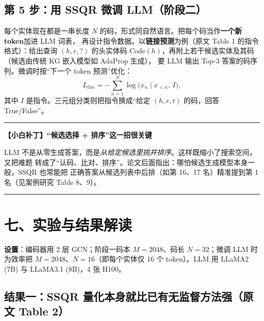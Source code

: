 \documentclass[11pt,UTF8,fontset=fandol]{ctexart}
\newenvironment{tip}[1]{%
  \par\smallskip\noindent\rule{\linewidth}{0.4pt}\par\nobreak
  \noindent\textbf{【小白补丁】#1}\par\nobreak\noindent\ignorespaces
}{%
  \par\noindent\rule{\linewidth}{0.4pt}\par\smallskip
}
\begin{document}
\subsection{第 5 步：用 SSQR 微调 LLM（阶段二）}
每个实体现在都是一串长度 $N$ 的码，形式同自然语言。把每个码当作\textbf{一个新 token}加进 LLM 词表，
再设计指令数据。以\textbf{链接预测}为例（原文 Table 1 的指令格式）：给出查询 $(h,r,?)$ 的头实体码
$\mathrm{Code}(h)$，再附上若干候选实体及其码（候选由传统 KG 嵌入模型如 AdaProp 生成），
要 LLM 输出 Top-3 答案的码序列。微调时按“下一个 token 预测”优化：
\begin{equation*}
  L_{llm}=-\sum_{n=1}^{N}\log\big(x_n\mid x_{<n},\,I\big),\tag{10}
\end{equation*}
其中 $I$ 是指令。三元组分类则把指令换成“给定 $(h,r,t)$ 的码，回答 True/False”。

\begin{tip}{“候选选择 + 排序”这一招很关键}
LLM 不是从零生成答案，而是\emph{从给定候选里挑并排序}。这样既缩小了搜索空间，又把难题
转成了“认码、比对、排序”。论文后面指出：哪怕候选生成模型本身一般，SSQR 也常能把
正确答案从候选列表中后排（如第 16、17 名）精准提到第 1 名（见案例研究 Table 8、9）。
\end{tip}

\section{七、实验与结果解读}

\textbf{设置}：编码器用 2 层 GCN；阶段一码本 $M{=}2048$、码长 $N{=}32$；微调 LLM 时为效率把
$M{=}2048$、$N{=}16$（即每个实体仅 16 个 token）。LLM 用 LLaMA2 (7B) 与 LLaMA3.1 (8B)，4 张 H100。

\subsection{结果一：SSQR 量化本身就比已有无监督方法强（原文 Table 2）}
\end{document}
